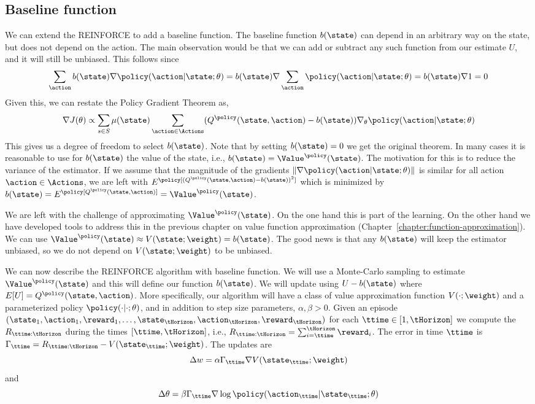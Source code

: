 \subsection*{Baseline function}
We can extend the REINFORCE to add a baseline function.
The baseline function $b(\state)$ can depend in an arbitrary way on
the state, but does not depend on the action. The main observation
would be that we can add or subtract any such function from our
estimate $U$, and it will still be unbiased. This follows since
\[
\sum_\action b(\state) \nabla
\policy(\action|\state;\theta)=b(\state)\nabla \sum_\action
\policy(\action|\state;\theta)=b(\state)\nabla 1=0
\]
Given this, we can restate the Policy Gradient Theorem as,
\[
\nabla J(\theta)\propto \sum_{s\in S} \mu(\state) \sum_{\action\in
\Actions} (Q^\policy (\state,\action)-b(\state))\nabla_\theta
\policy(\action|\state;\theta)
\]
This gives us a degree of freedom to select $b(\state)$. Note that
by setting $b(\state)=0$ we get the original theorem. In many cases
it is reasonable to use for $b(\state)$ the value of the state,
i.e., $b(\state)=\Value^\policy(\state)$. The motivation for this is
to reduce the variance of the estimator. If we assume that the
magnitude of the gradients $\|\nabla
\policy(\action|\state;\theta)\|$ is similar for all action
$\action\in \Actions$, we are left with $E^\policy
[(Q^\policy(\state,\action)-b(\state))^2]$ which is minimized by
$b(\state)=E^\policy[Q^\policy(\state,\action)]=\Value^\policy(\state)$.

We are left with the challenge of approximating
$\Value^\policy(\state)$. On the one hand this is part of the
learning. On the other hand we have developed tools to address this
in the previous chapter on value function approximation (Chapter~\ref{chapter:function-approximation}). We can use
$\Value^\policy(\state)\approx V(\state;\weight)=b(\state)$. The
good news is that any $b(\state)$ will keep the estimator unbiased,
so we do not depend on $V(\state;\weight)$ to be unbiased.

We can now describe the REINFORCE algorithm with baseline function.
We will use a Monte-Carlo sampling to estimate
$\Value^\policy(\state)$ and this will define our function
$b(\state)$. We will update using $U-b(\state)$ where
$E[U]=Q^\policy(\state,\action)$. More specifically, our algorithm
will have a class of value approximation function $V(\cdot;\weight)$
and a parameterized policy $\policy(\cdot|\cdot;\theta)$, and in
addition to step size parameters, $\alpha,\beta>0$. Given an episode
$(\state_1,\action_1,\reward_1,
\ldots,\state_\tHorizon,\action_\tHorizon,\reward_\tHorizon)$ for each $\ttime\in [1,\tHorizon]$ we
compute the $R_{\ttime:\tHorizon}$ during the times $[\ttime,\tHorizon]$, i.e.,
$R_{\ttime:\tHorizon}=\sum_{i=\ttime}^\tHorizon \reward_i$. The error in time $\ttime$ is
$\Gamma_\ttime=R_{\ttime:\tHorizon}-V(\state_\ttime;\weight)$. The updates
are
\[
\Delta w=\alpha \Gamma_\ttime \nabla V(\state_\ttime;\weight)
\]
and
\[
\Delta \theta=\beta\Gamma_\ttime \nabla \log
\policy(\action_\ttime|\state_\ttime;\theta)
\]

